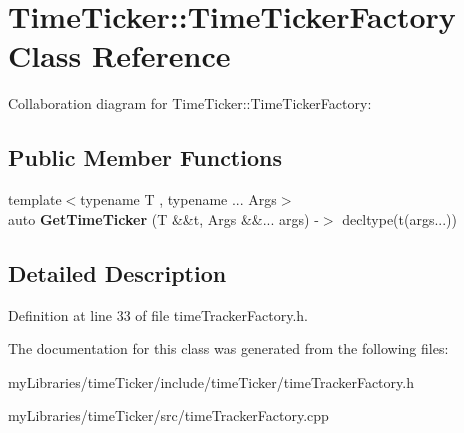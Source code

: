 \hypertarget{classTimeTicker_1_1TimeTickerFactory}{}\section{Time\+Ticker\+::Time\+Ticker\+Factory Class Reference}
\label{classTimeTicker_1_1TimeTickerFactory}


Collaboration diagram for Time\+Ticker\+::Time\+Ticker\+Factory\+:
\subsection*{Public Member Functions}
\begin{DoxyCompactItemize}
\item 
\mbox{\label{classTimeTicker_1_1TimeTickerFactory_a71b3c58f07f76b37e54349baeb281d34}} 
{\footnotesize template$<$typename T , typename ... Args$>$ }\\auto {\bfseries Get\+Time\+Ticker} (T \&\&t, Args \&\&... args) -\/$>$ decltype(t(args...))
\end{DoxyCompactItemize}


\subsection{Detailed Description}


Definition at line 33 of file time\+Tracker\+Factory.\+h.



The documentation for this class was generated from the following files\+:\begin{DoxyCompactItemize}
\item 
my\+Libraries/time\+Ticker/include/time\+Ticker/time\+Tracker\+Factory.\+h\item 
my\+Libraries/time\+Ticker/src/time\+Tracker\+Factory.\+cpp\end{DoxyCompactItemize}
